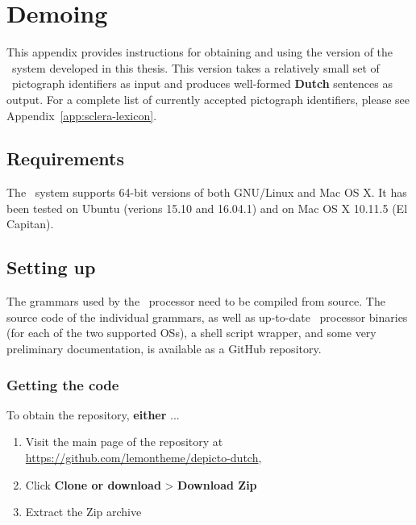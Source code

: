 
\appendix
\chapter{Demoing \depicto}
\label{app:settingupdepicto}

This appendix provides instructions for obtaining and using the version of the
\depicto\ system developed in this thesis. This version takes a relatively
small set of \sclera\ pictograph identifiers as input and produces well-formed
\textbf{Dutch} sentences as output. For a complete list of currently accepted
pictograph identifiers, please see Appendix~\ref{app:sclera-lexicon}.

\section*{Requirements}

The \depicto\ system supports 64-bit versions of both GNU/Linux and Mac OS X.
It has been tested on Ubuntu (verions 15.10 and 16.04.1) and on Mac OS X
10.11.5 (El Capitan).

\section*{Setting up}

The grammars used by the \ace\ processor need to be compiled from source. The
source code of the individual grammars, as well as up-to-date \ace\ processor
binaries (for each of the two supported OSs), a shell script wrapper, and some
very preliminary documentation, is available as a GitHub repository.

\subsection*{Getting the code}

To obtain the repository, \textbf{either} ...

\begin{enumerate}
    \item Visit the main page of the repository at
          \url{https://github.com/lemontheme/depicto-dutch},
    \item Click \textbf{Clone or download} >
          \textbf{Download Zip}
    \item Extract the Zip archive
\end{enumerate}

